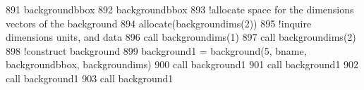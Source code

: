 \begin{DoxyCode}
891     backgroundbbox%
892     backgroundbbox%
893     \textcolor{comment}{!allocate space for the dimensions vectors of the background}
894     \textcolor{keyword}{allocate}(backgroundims(2))
895     \textcolor{comment}{!inquire dimensions units, and data}
896     \textcolor{keyword}{call }backgroundims(1)%
897     \textcolor{keyword}{call }backgroundims(2)%
898     \textcolor{comment}{!construct background}
899     background1 = background(5, bname, backgroundbbox, backgroundims)
900     \textcolor{keyword}{call }background1%
901     \textcolor{keyword}{call }background1%
902     \textcolor{keyword}{call }background1%
903     \textcolor{keyword}{call }background1%
\end{DoxyCode}
